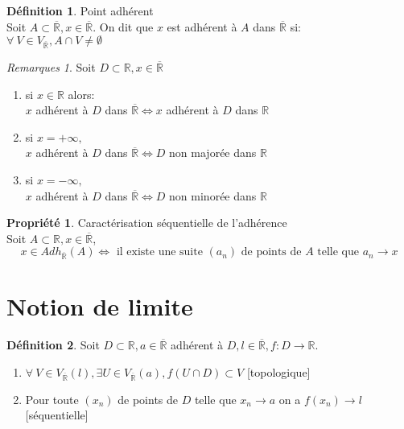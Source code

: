 \documentclass[fleqn]{article}
\theoremstyle{definition} \newtheorem*{defi}{D\'efinition}
\theoremstyle{definition} \newtheorem*{theo}{Th\'eor\`eme}
\theoremstyle{definition} \newtheorem*{prop}{Propri\'et\'e}
\theoremstyle{remark} \newtheorem*{rqs}{Remarques}
\begin{document}
\begin{defi} Point adh\'erent \\
		Soit $A \subset \overline{\mathbb{R}}, x \in \overline{\mathbb{R}}$. On dit que $x$ est adh\'erent \`a $A$ dans
		$\overline{\mathbb{R}}$ si: \\
		$\forall\ V \in V_{\overline{\mathbb{R}}}, A \cap V \neq \emptyset$
\end{defi}

\begin{rqs}
	Soit $D \subset \mathbb{R}, x \in \overline{\mathbb{R}}$
	\begin{enumerate}
		\item si $x \in \mathbb{R}$ alors: \\
			$x$ adh\'erent \`a $D$ dans $\overline{\mathbb{R}} \Leftrightarrow x$ adh\'erent \`a $D$ dans $\mathbb{R}$
		\item si $x = +\infty,$ \\
			$x$ adh\'erent \`a $D$ dans $\overline{\mathbb{R}} \Leftrightarrow D$ non major\'ee dans $\mathbb{R}$
		\item si $x = -\infty,$ \\
			$x$ adh\'erent \`a $D$ dans $\overline{\mathbb{R}} \Leftrightarrow D$ non minor\'ee dans $\mathbb{R}$
	\end{enumerate}
\end{rqs}
\begin{prop} Caract\'erisation s\'equentielle de l'adh\'erence \\
	Soit $A \subset \mathbb{R}, x \in \overline{\mathbb{R}}$,
	\[x \in Adh_{\overline{\mathbb{R}}}(A) \Leftrightarrow \text{ il existe une suite } (a_n) \text{ de points de } A \text{ telle que }
	a_n \rightarrow x\]
\end{prop}

\section{Notion de limite}
\begin{defi}
	Soit $D \subset \mathbb{R}, a \in \overline{\mathbb{R}}$ adh\'erent \`a $D, l \in \overline{\mathbb{R}}, f: D \rightarrow \mathbb{R}$.
	\begin{enumerate}
		\item $\forall\ V \in V_{\overline{\mathbb{R}}}(l), \exists U \in V_{\overline{\mathbb{R}}}(a), f(U \cap D) \subset V$ [topologique]
		\item Pour toute $(x_n)$ de points de $D$ telle que $x_n \rightarrow a$ on a $f(x_n) \rightarrow l $ [s\'equentielle]
	\end{enumerate}
\end{defi}
\end{document}

